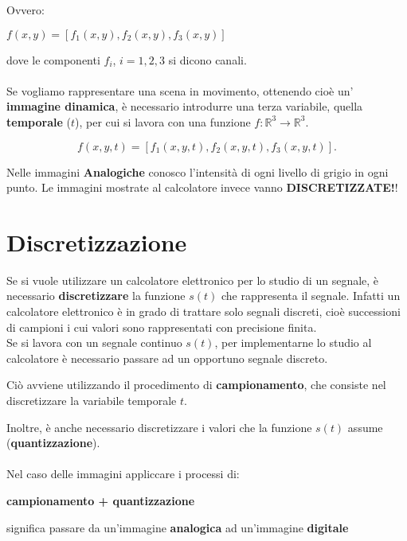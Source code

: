 Ovvero:
\begin{center}
    $f(x,y) = [f_1(x,y), f_2(x,y), f_3(x,y)]$
\end{center}
dove le componenti $f_i$, $i = 1,2,3$ si dicono canali. \\\\Se vogliamo
rappresentare una scena in movimento, ottenendo cioè un' \textbf{immagine
    dinamica}, è necessario introdurre una terza variabile, quella
\textbf{temporale} ($t$), per cui si lavora con una funzione $f: \mathbb{R}^3 \rightarrow
    \mathbb{R}^3$.

$$
    f(x,y,t) = [f_1(x,y,t), f_2(x ,y,t), f_3(x,y,t)].
$$

Nelle immagini \textbf{Analogiche} conosco l'intensità di ogni livello di grigio
in ogni punto. Le immagini mostrate al calcolatore invece vanno
\textbf{DISCRETIZZATE!}!


\section{Discretizzazione}
Se si vuole utilizzare un calcolatore elettronico per lo studio di un segnale, è
necessario \textbf{discretizzare} la funzione $s(t)$ che rappresenta il segnale.
Infatti un calcolatore elettronico è in grado di trattare solo segnali discreti,
cioè successioni di campioni i cui valori sono rappresentati con precisione
finita. \\Se si lavora con un segnale continuo $s(t)$, per implementarne lo
studio al calcolatore è necessario passare ad un opportuno segnale discreto.
\begin{center}
    Ciò avviene utilizzando il procedimento di \textbf{campionamento}, che
    consiste nel discretizzare la variabile temporale $t$.
\end{center}
Inoltre, è anche necessario discretizzare i valori che la funzione $s(t)$ assume
(\textbf{quantizzazione}). \\\\Nel caso delle immagini appliccare i processi di:
\begin{center}
    \textbf{campionamento + quantizzazione}
\end{center}
significa passare da un'immagine \textbf{analogica} ad un'immagine
\textbf{digitale}
